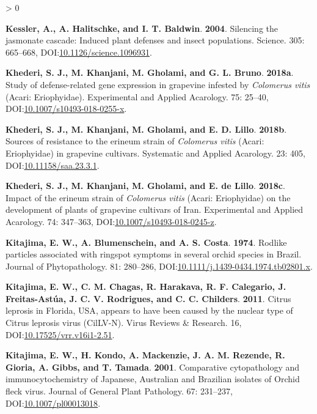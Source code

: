 \documentclass{ufdissertation}[overrideChapters] %
\newlength{\cslhangindent}
\newenvironment{CSLReferences}[2] %
 {%
  \setlength{\parindent}{0pt}
  \ifodd #1 \everypar{\setlength{\hangindent}{\cslhangindent}}\ignorespaces\fi
  \ifnum #2 > 0
  \setlength{\parskip}{#2\baselineskip}
  \fi
 }%
 {}
\begin{document}
{\begin{CSLReferences}{1}{1}
\leavevmode{}%
\textbf{Kessler, A., A. Halitschke, and I. T. Baldwin}. \textbf{2004}. Silencing the jasmonate cascade: Induced plant defenses and insect populations. Science. 305: 665--668, DOI:\href{https://doi.org/10.1126/science.1096931}{10.1126/science.1096931}.

\leavevmode{}%
\textbf{Khederi, S. J., M. Khanjani, M. Gholami, and G. L. Bruno}. \textbf{2018a}. Study of defense-related gene expression in grapevine infested by {\emph{Colomerus vitis}} ({Acari}: {Eriophyidae}). Experimental and Applied Acarology. 75: 25--40, DOI:\href{https://doi.org/10.1007/s10493-018-0255-x}{10.1007/s10493-018-0255-x}.

\leavevmode{}%
\textbf{Khederi, S. J., M. Khanjani, M. Gholami, and E. D. Lillo}. \textbf{2018b}. Sources of resistance to the erineum strain of {\emph{Colomerus vitis}} ({Acari}: {Eriophyidae}) in grapevine cultivars. Systematic and Applied Acarology. 23: 405, DOI:\href{https://doi.org/10.11158/saa.23.3.1}{10.11158/saa.23.3.1}.

\leavevmode{}%
\textbf{Khederi, S. J., M. Khanjani, M. Gholami, and E. de Lillo}. \textbf{2018c}. Impact of the erineum strain of {\emph{Colomerus vitis}} ({Acari}: {Eriophyidae}) on the development of plants of grapevine cultivars of {Iran}. Experimental and Applied Acarology. 74: 347--363, DOI:\href{https://doi.org/10.1007/s10493-018-0245-z}{10.1007/s10493-018-0245-z}.

\leavevmode{}%
\textbf{Kitajima, E. W., A. Blumenschein, and A. S. Costa}. \textbf{1974}. Rodlike particles associated with ringspot symptoms in several orchid species in {Brazil}. Journal of Phytopathology. 81: 280--286, DOI:\href{https://doi.org/10.1111/j.1439-0434.1974.tb02801.x}{10.1111/j.1439-0434.1974.tb02801.x}.

\leavevmode{}%
\textbf{Kitajima, E. W., C. M. Chagas, R. Harakava, R. F. Calegario, J. Freitas-Astúa, J. C. V. Rodrigues, and C. C. Childers}. \textbf{2011}. {Citrus leprosis} in {Florida}, {USA}, appears to have been caused by the nuclear type of {Citrus leprosis virus} ({CilLV-N}). Virus Reviews {\&} Research. 16, DOI:\href{https://doi.org/10.17525/vrr.v16i1-2.51}{10.17525/vrr.v16i1-2.51}.

\leavevmode{}%
\textbf{Kitajima, E. W., H. Kondo, A. Mackenzie, J. A. M. Rezende, R. Gioria, A. Gibbs, and T. Tamada}. \textbf{2001}. Comparative cytopathology and immunocytochemistry of {Japanese}, {Australian} and {Brazilian} isolates of {Orchid fleck virus}. Journal of General Plant Pathology. 67: 231--237, DOI:\href{https://doi.org/10.1007/pl00013018}{10.1007/pl00013018}.


\end{CSLReferences}}
\end{document}
